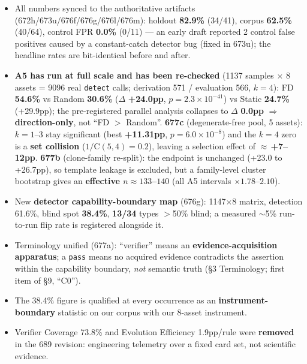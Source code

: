 \documentclass[11pt]{article}
\begin{document}
\begin{itemize}[leftmargin=1.4em]
  \item All numbers synced to the authoritative artifacts (672h/673u/676f/676g/676l/676m): holdout
        \textbf{82.9\%} (34/41), corpus \textbf{62.5\%} (40/64), control FPR \textbf{0.0\%} (0/11) ---
        an early draft reported 2 control false positives caused by a constant-catch detector bug
        (fixed in 673u); the headline rates are bit-identical before and after.
  \item \textbf{A5 has run at full scale and has been re-checked} (1137 samples $\times$ 8 assets =
        9096 real \texttt{detect} calls; derivation 571 / evaluation 566, $k{=}4$): FD \textbf{54.6\%}
        vs Random \textbf{30.6\%} ($\Delta$ \textbf{+24.0pp}, $p{=}2.3\times10^{-41}$) vs Static
        \textbf{24.7\%} (+29.9pp); the
        pre-registered parallel analysis collapses to $\Delta$ \textbf{0.0pp} $\Rightarrow$
        \textbf{direction-only}, not ``FD $>$ Random''. \textbf{677c} (degenerate-free pool, 5 assets):
        $k{=}1$--3 stay significant (best \textbf{+11.31pp}, $p{=}6.0\times10^{-8}$) and the $k{=}4$
        zero is a \textbf{set collision} ($1/\mathrm{C}(5,4){=}0.2$), leaving a selection effect of
        $\approx$\,\textbf{+7--12pp}. \textbf{677b} (clone-family re-split): the endpoint is unchanged
        (+23.0 to +26.7pp), so template leakage is excluded, but a family-level cluster bootstrap gives
        an \textbf{effective $n\approx133$--$140$} (all A5 intervals $\times1.78$--$2.10$).
  \item New \textbf{detector capability-boundary map} (676g): 1147$\times$8 matrix, detection 61.6\%,
        blind spot \textbf{38.4\%}, \textbf{13/34} types $>$50\% blind; a measured $\sim$5\%
        run-to-run flip rate is registered alongside it.
  \item Terminology unified (677a): ``verifier'' means an \textbf{evidence-acquisition apparatus};
        a \texttt{pass} means no acquired evidence contradicts the assertion within the capability
        boundary, \emph{not} semantic truth (\S3 Terminology; first item of \S9, ``C0'').
  \item The 38.4\% figure is qualified at every occurrence as an \textbf{instrument-boundary}
        statistic on our corpus with our 8-asset instrument.
  \item Verifier Coverage 73.8\% and Evolution Efficiency 1.9pp/rule were \textbf{removed} in the 689
        revision: engineering telemetry over a fixed card set, not scientific evidence.

\end{itemize}
\end{document}

